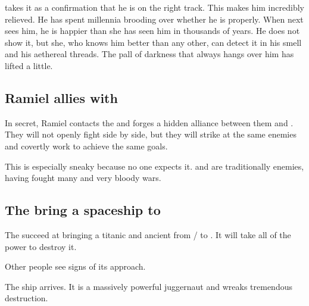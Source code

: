 \Ishnaruchaefir{} takes it as a confirmation that he is on the right track. 
This makes him incredibly relieved. 
He has spent millennia brooding over whether he is  properly. 
When \Criseis{} next sees him, he is happier than she has seen him in thousands of years. 
He does not show it, but she, who knows him better than any other, can detect it in his smell and his aethereal threads. 
The pall of darkness that always hangs over him has lifted a little. 










\subsection{Ramiel allies with \Baelzerach}
In secret, Ramiel contacts the \Baelzerach{} and forges a hidden alliance between them and \Mystraacht. They will not openly fight side by side, but they will strike at the same enemies and covertly work to achieve the same goals. 

This is especially sneaky because no one expects it. \Mystraacht{} and \Baelzerach{} are traditionally enemies, having fought many and very bloody wars. 









\subsection{The \banes bring a spaceship to \Miith}
The \banelords{} succeed at bringing a titanic and ancient  from \Erebos/\Nyx{} to \Miith{}. 
It will take all of the \psp{\dragons}{} \xsic{} power to destroy it.

Other people see signs of its approach.


The ship arrives. 
It is a massively powerful juggernaut and wreaks tremendous destruction. 

